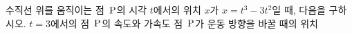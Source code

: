 수직선 위를 움직이는 점~$\mathrm{P}$의 시각 $t$에서의 위치 $x$가 $x=t^3-3t^2$일 때, 다음을 구하시오.
 $t=3$에서의 점~$\mathrm{P}$의 속도와 가속도
 점~$\mathrm{P}$가 운동 방향을 바꿀 때의 위치

